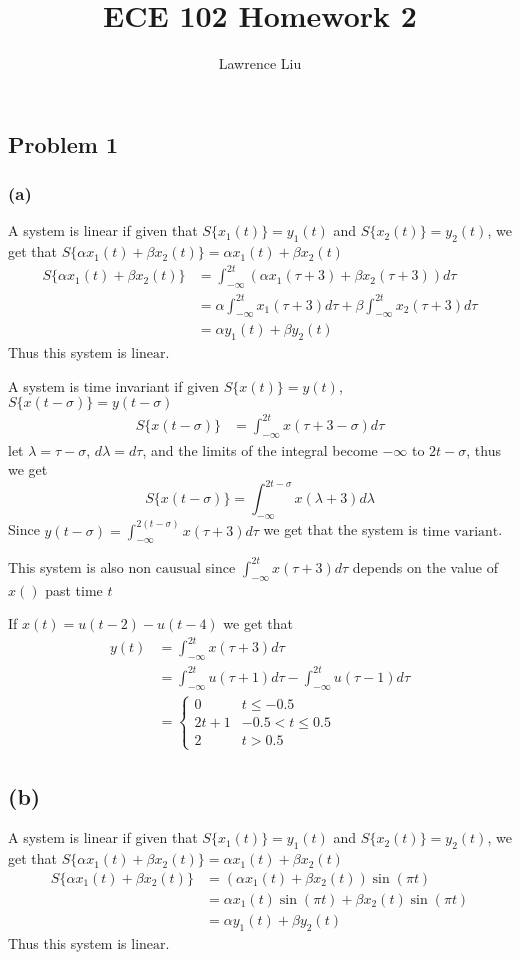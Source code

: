 \documentclass[12pt]{article}
\title{ECE 102 Homework 2}
\author{Lawrence Liu}
\begin{document}
\maketitle
\subsection*{Problem 1}
\subsubsection*{(a)}
A system is linear if given that $S\{x_1(t)\}=y_1(t)$ and $S\{x_2(t)\}=y_2(t)$, we get that $S\{\alpha x_1(t)+\beta x_2(t)\}=\alpha x_1(t) +\beta x_2(t)$
\begin{align*}
S\{\alpha x_1(t)+\beta x_2(t)\}&=\int_{-\infty}^{2t}(\alpha x_1(\tau+3)+\beta x_2(\tau+3))d\tau\\
&=\alpha\int_{-\infty}^{2t}x_1(\tau+3)d\tau+\beta\int_{-\infty}^{2t}x_2(\tau+3)d\tau\\
&=\alpha y_1(t)+\beta y_2(t)
\end{align*}
Thus this system is $\boxed{\text{linear}}$.

A system is time invariant if given $S\{x(t)\}=y(t)$, $S\{x(t-\sigma)\}=y(t-\sigma)$
\begin{align*}
S\{x(t-\sigma)\}&=\int_{-\infty}^{2t}x(\tau+3-\sigma)d\tau
\end{align*}
let $\lambda=\tau-\sigma$, $d\lambda=d\tau$, and the limits of the integral become $-\infty$ to $2t-\sigma$, thus we get
$$S\{x(t-\sigma)\}=\int_{-\infty}^{2t-\sigma}x(\lambda+3)d\lambda$$
Since $y(t-\sigma)=\int_{-\infty}^{2(t-\sigma)}x(\tau+3)d\tau$ we get that the system is $\boxed{\text{time variant}}$.

This system is also $\boxed{\text{non causual}}$ since $\int_{-\infty}^{2t}x(\tau+3)d\tau$ depends on the value of $x()$ past time $t$

If $x(t)=u(t-2)-u(t-4)$ we get that 
\begin{align*}
y(t)&=\int_{-\infty}^{2t}x(\tau+3)d\tau\\
&=\int_{-\infty}^{2t}u(\tau+1)d\tau-\int_{-\infty}^{2t}u(\tau-1)d\tau\\
&=\boxed{\begin{cases}
0 & t\leq-0.5\\
2t+1 & -0.5<t\leq0.5\\
2 & t>0.5
\end{cases}}
\end{align*}
\subsection*{(b)}
A system is linear if given that $S\{x_1(t)\}=y_1(t)$ and $S\{x_2(t)\}=y_2(t)$, we get that $S\{\alpha x_1(t)+\beta x_2(t)\}=\alpha x_1(t) +\beta x_2(t)$
\begin{align*}
S\{\alpha x_1(t)+\beta x_2(t)\}&=(\alpha x_1(t)+\beta x_2(t))\sin(\pi t)\\
&=\alpha x_1(t)\sin(\pi t)+\beta x_2(t)\sin(\pi t)\\
&=\alpha y_1(t)+\beta y_2(t)
\end{align*}
Thus this system is $\boxed{\text{linear}}$.
\end{document}
